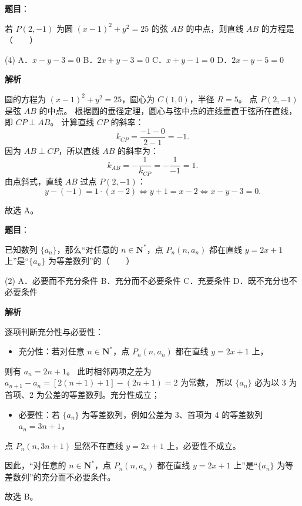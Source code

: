 \begin{answer}

\textbf{题目}：

若 $P(2, -1)$ 为圆 $(x - 1)^2 + y^2 = 25$ 的弦 $AB$ 的中点，则直线 $AB$ 的方程是\mbox{（　　）}

\begin{gkopts}(4)
\task A．$x - y - 3 = 0$
\task B．$2x + y - 3 = 0$
\task C．$x + y - 1 = 0$
\task D．$2x - y - 5 = 0$
\end{gkopts}

\textbf{解析}

圆的方程为 $(x - 1)^2 + y^2 = 25$，圆心为 $C(1, 0)$，半径 $R = 5$。
点 $P(2, -1)$ 是弦 $AB$ 的中点。
根据圆的垂径定理，圆心与弦中点的连线垂直于弦所在直线，即 $CP \perp AB$。
计算直线 $CP$ 的斜率：
\nopagebreak[4]
\[
k_{CP} = \dfrac{-1 - 0}{2 - 1} = -1.
\]
因为 $AB \perp CP$，所以直线 $AB$ 的斜率为：
\nopagebreak[4]
\[
k_{AB} = -\dfrac{1}{k_{CP}} = -\dfrac{1}{-1} = 1.
\]
由点斜式，直线 $AB$ 过点 $P(2, -1)$：
\nopagebreak[4]
\[
y - (-1) = 1 \cdot (x - 2) \iff y + 1 = x - 2 \iff x - y - 3 = 0.
\]

故选 A。


\end{answer}
\begin{answer}

\textbf{题目}：

已知数列 $\{a_n\}$，那么“对任意的 $n \in \mathbf{N}^*$，点 $P_n(n, a_n)$ 都在直线 $y = 2x + 1$ 上”是“$\{a_n\}$ 为等差数列”的\mbox{（　　）}

\begin{gkopts}(2)
\task A．必要而不充分条件
\task B．充分而不必要条件
\task C．充要条件
\task D．既不充分也不必要条件
\end{gkopts}

\textbf{解析}

逐项判断充分性与必要性：
\begin{itemize}
\item 充分性：若对任意 $n \in \mathbf{N}^*$，点 $P_n(n, a_n)$ 都在直线 $y = 2x + 1$ 上，
\end{itemize}
  则有 $a_n = 2n + 1$。
  此时相邻两项之差为 $a_{n+1} - a_n = [2(n+1) + 1] - (2n + 1) = 2$ 为常数，
  所以 $\{a_n\}$ 必为以 3 为首项、2 为公差的等差数列。充分性成立；
\begin{itemize}
\item 必要性：若 $\{a_n\}$ 为等差数列，例如公差为 3、首项为 4 的等差数列 $a_n = 3n + 1$，
\end{itemize}
  点 $P_n(n, 3n+1)$ 显然不在直线 $y = 2x + 1$ 上，必要性不成立。

因此，“对任意的 $n \in \mathbf{N}^*$，点 $P_n(n, a_n)$ 都在直线 $y = 2x + 1$ 上”是“$\{a_n\}$ 为等差数列”的充分而不必要条件。

故选 B。


\end{answer}
